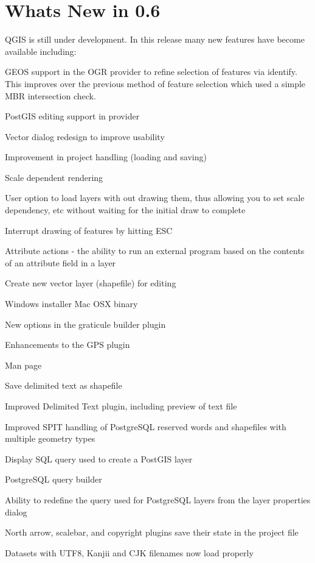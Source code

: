 \section{Whats New in 0.6}
QGIS is still under development. In this release many new features have become available including:
\begin{compactenum}
\item GEOS support in the OGR provider to refine selection of features via identify. This improves over the previous method of feature selection which used a simple MBR intersection check.
\item PostGIS editing support in provider
\item Vector dialog redesign to improve usability
\item Improvement in project handling (loading and saving)
\item Scale dependent rendering
\item User option to load layers with out drawing them, thus allowing you to set scale dependency, etc without waiting for the initial draw to complete
\item Interrupt drawing of features by hitting ESC
\item Attribute actions - the ability to run an external program based on the contents of an attribute field in a layer
\item Create new vector layer (shapefile) for editing
\item Windows installer
 Mac OSX binary
\item New options in the graticule builder plugin
\item Enhancements to the GPS plugin
\item Man page
\item Save delimited text as shapefile
\item Improved Delimited Text plugin, including preview of text file
\item Improved SPIT handling of PostgreSQL reserved words and shapefiles with multiple geometry types
\item Display SQL query used to create a PostGIS layer
\item PostgreSQL query builder
\item Ability to redefine the query used for PostgreSQL layers from the layer properties dialog
\item North arrow, scalebar, and copyright plugins save their state in the project file
\item Datasets with UTF8, Kanjii and CJK filenames now load properly

\end{compactenum}

